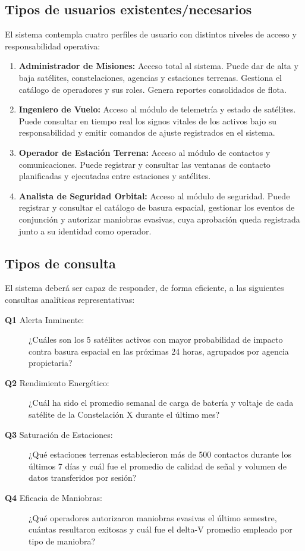 \subsection{Tipos de usuarios existentes/necesarios}

El sistema contempla cuatro perfiles de usuario con distintos niveles de acceso y responsabilidad operativa:

\begin{enumerate}
    \item \textbf{Administrador de Misiones:} Acceso total al sistema. Puede dar de alta y baja satélites, constelaciones, agencias y estaciones terrenas. Gestiona el catálogo de operadores y sus roles. Genera reportes consolidados de flota.
    \item \textbf{Ingeniero de Vuelo:} Acceso al módulo de telemetría y estado de satélites. Puede consultar en tiempo real los signos vitales de los activos bajo su responsabilidad y emitir comandos de ajuste registrados en el sistema.
    \item \textbf{Operador de Estación Terrena:} Acceso al módulo de contactos y comunicaciones. Puede registrar y consultar las ventanas de contacto planificadas y ejecutadas entre estaciones y satélites.
    \item \textbf{Analista de Seguridad Orbital:} Acceso al módulo de seguridad. Puede registrar y consultar el catálogo de basura espacial, gestionar los eventos de conjunción y autorizar maniobras evasivas, cuya aprobación queda registrada junto a su identidad como operador.
\end{enumerate}

\subsection{Tipos de consulta}

El sistema deberá ser capaz de responder, de forma eficiente, a las siguientes consultas analíticas representativas:

\begin{description}
    \item[\textbf{Q1} Alerta Inminente:] ¿Cuáles son los 5 satélites activos con mayor probabilidad de impacto contra basura espacial en las próximas 24 horas, agrupados por agencia propietaria?
    \item[\textbf{Q2} Rendimiento Energético:] ¿Cuál ha sido el promedio semanal de carga de batería y voltaje de cada satélite de la Constelación X durante el último mes?
    \item[\textbf{Q3} Saturación de Estaciones:] ¿Qué estaciones terrenas establecieron más de 500 contactos durante los últimos 7 días y cuál fue el promedio de calidad de señal y volumen de datos transferidos por sesión?
    \item[\textbf{Q4} Eficacia de Maniobras:] ¿Qué operadores autorizaron maniobras evasivas el último semestre, cuántas resultaron exitosas y cuál fue el delta-V promedio empleado por tipo de maniobra?
\end{description}

